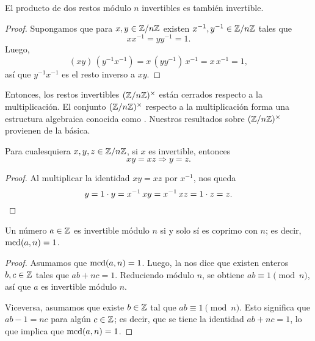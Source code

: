 \documentclass{article}
\theoremstyle{plain}
\begin{document}
\begin{observacion}
  El producto de dos restos módulo $n$ invertibles es también invertible.

\begin{proof}
  Supongamos que para $x,y \in \mathbb{Z}/n\mathbb{Z}$ existen $x^{-1}, y^{-1} \in \mathbb{Z}/n\mathbb{Z}$
  tales que
  $$x x^{-1} = y y^{-1} = 1.$$
  Luego,
  $$(x y)\,(y^{-1} x^{-1}) = x \, (y y^{-1}) \, x^{-1} = x\,x^{-1} = 1,$$
  así que $y^{-1} x^{-1}$ es el resto inverso a $x y$.
\end{proof}
\end{observacion}

\begin{digresion}
  Entonces, los restos invertibles $(\mathbb{Z}/n\mathbb{Z})^\times$ están cerrados respecto a
  la multiplicación. El conjunto $(\mathbb{Z}/n\mathbb{Z})^\times$ respecto a la
  multiplicación forma una estructura algebraica conocida como
  . Nuestros resultados sobre $(\mathbb{Z}/n\mathbb{Z})^\times$ provienen de la
   básica.
\end{digresion}

\begin{observacion}[Cancelación]
  Para cualesquiera $x,y,z \in \mathbb{Z}/n\mathbb{Z}$, si $x$ es invertible, entonces
  $$xy = xz \Longrightarrow y = z.$$

  \begin{proof}
    Al multiplicar la identidad $xy = xz$ por $x^{-1}$, nos queda
    \[ y = 1\cdot y = x^{-1}\,xy = x^{-1}\,xz = 1\cdot z = z. \qedhere \]
  \end{proof}
\end{observacion}

\begin{proposicion}
  Un número $a \in \mathbb{Z}$ es invertible módulo $n$ si y solo sí es coprimo con
  $n$; es decir, $\operatorname{mcd} (a,n) = 1$.

\begin{proof}
  Asumamos que $\operatorname{mcd} (a,n) = 1$. Luego, la  nos dice
  que existen enteros $b, c \in \mathbb{Z}$ tales que $ab + nc = 1$. Reduciendo módulo
  $n$, se obtiene $ab \equiv 1 \pmod{n}$, así que $a$ es invertible módulo $n$.

  Viceversa, asumamos que existe $b \in \mathbb{Z}$ tal que $ab \equiv 1
  \pmod{n}$. Esto significa que $ab - 1 = nc$ para algún $c \in \mathbb{Z}$; es decir,
  que se tiene la identidad $ab + nc = 1$, lo que implica que $\operatorname{mcd} (a,n) = 1$.
\end{proof}
\end{proposicion}
\end{document}

